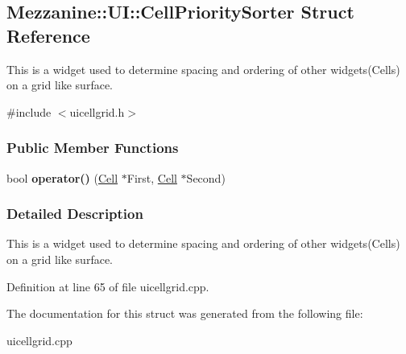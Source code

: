 \hypertarget{structMezzanine_1_1UI_1_1CellPrioritySorter}{
\subsection{Mezzanine::UI::CellPrioritySorter Struct Reference}
\label{structMezzanine_1_1UI_1_1CellPrioritySorter}
}


This is a widget used to determine spacing and ordering of other widgets(Cells) on a grid like surface.  




{\ttfamily \#include $<$uicellgrid.h$>$}

\subsubsection*{Public Member Functions}
\begin{DoxyCompactItemize}
\item 
\hypertarget{structMezzanine_1_1UI_1_1CellPrioritySorter_a1fe1b9a5ae060b3b325d743d4dec608f}{
bool {\bfseries operator()} (\hyperlink{classMezzanine_1_1UI_1_1Cell}{Cell} $\ast$First, \hyperlink{classMezzanine_1_1UI_1_1Cell}{Cell} $\ast$Second)}
\label{structMezzanine_1_1UI_1_1CellPrioritySorter_a1fe1b9a5ae060b3b325d743d4dec608f}

\end{DoxyCompactItemize}


\subsubsection{Detailed Description}
This is a widget used to determine spacing and ordering of other widgets(Cells) on a grid like surface. 

Definition at line 65 of file uicellgrid.cpp.



The documentation for this struct was generated from the following file:\begin{DoxyCompactItemize}
\item 
uicellgrid.cpp\end{DoxyCompactItemize}
